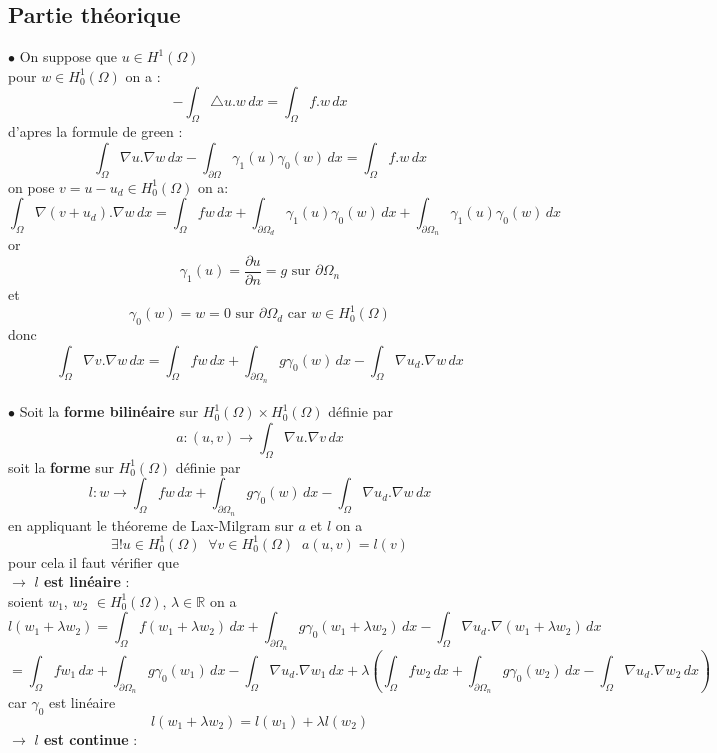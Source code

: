 \documentclass{article}
\begin{document}
\subsection{Partie théorique}
$\bullet$ On suppose que $u \in H^{1}(\Omega)$ \\
pour $w \in H_{0}^{1}(\Omega)$ on a :
$$
- \int_{\Omega} \triangle u . w \,dx = \int_{\Omega} f . w \,dx
$$
d'apres la formule de green :
$$
\int_{\Omega} \nabla u . \nabla w \,dx - \int_{\partial \Omega} \gamma_{1}(u) \gamma_{0}(w) \,dx = \int_{\Omega} f . w \,dx
$$
on pose $v = u - u_d \in H_{0}^{1}(\Omega)$ on a:
$$
\int_{\Omega} \nabla (v + u_d) . \nabla w \,dx  = \int_{\Omega} f w \,dx + \int_{\partial \Omega_{d}} \gamma_{1}(u) \gamma_{0}(w) \,dx + \int_{\partial \Omega_{n}} \gamma_{1}(u) \gamma_{0}(w) \,dx 
$$
or 
$$
\gamma_1(u) = \frac{\partial u}{\partial n} = g \textrm{ sur } \partial \Omega_{n}
$$
et
$$
\gamma_0(w) = w = 0 \textrm{ sur } \partial \Omega_{d} \textrm{ car } w \in H_{0}^{1}(\Omega)
$$
donc 
$$
\boxed{\int_{\Omega} \nabla v . \nabla w \,dx = \int_{\Omega} f w \,dx + \int_{\partial \Omega_{n}} g \gamma_{0}(w) \,dx - \int_{\Omega} \nabla u_d . \nabla w \,dx}
$$
\\
$\bullet$ Soit la \textbf{forme bilinéaire} sur $H_{0}^{1}(\Omega) \times H_{0}^{1}(\Omega)$ définie par 
$$
a : (u, v) \rightarrow \int_{\Omega} \nabla u . \nabla v \,dx
$$
soit la \textbf{forme} sur $H_{0}^{1}(\Omega)$ définie par
$$
l : w \rightarrow \int_{\Omega} f w \,dx + \int_{\partial \Omega_{n}} g \gamma_{0}(w) \,dx - \int_{\Omega} \nabla u_d . \nabla w \,dx
$$
en appliquant le théoreme de Lax-Milgram sur $a$ et $l$ on a 
$$
\boxed{\exists ! u \in H_{0}^{1}(\Omega) \; \; \forall v \in H_{0}^{1}(\Omega) \; \; a(u, v) = l(v)}
$$
pour cela il faut vérifier que \\
$\rightarrow$ \textbf{$l$ est linéaire} : \\
soient $w_1$, $w_2$ $\in H_{0}^{1}(\Omega)$, $\lambda \in \mathbb{R}$ on a 
$$
l(w_1 + \lambda w_2) = \int_{\Omega} f (w_1 + \lambda w_2) \,dx + \int_{\partial \Omega_{n}} g \gamma_{0}(w_1 + \lambda w_2) \,dx - \int_{\Omega} \nabla u_d . \nabla (w_1 + \lambda w_2) \,dx
$$
$$
= \int_{\Omega} f w_1 \,dx + \int_{\partial \Omega_{n}} g \gamma_{0}(w_1) \,dx - \int_{\Omega} \nabla u_d . \nabla w_1 \,dx + \lambda(\int_{\Omega} f w_2 \,dx + \int_{\partial \Omega_{n}} g \gamma_{0}(w_2) \,dx - \int_{\Omega} \nabla u_d . \nabla w_2 \,dx)
$$
car $\gamma_0$ est linéaire
$$
l(w_1 + \lambda w_2) = l(w_1) + \lambda l(w_2)
$$
$\rightarrow$ \textbf{$l$ est continue} : \\
\end{document}
